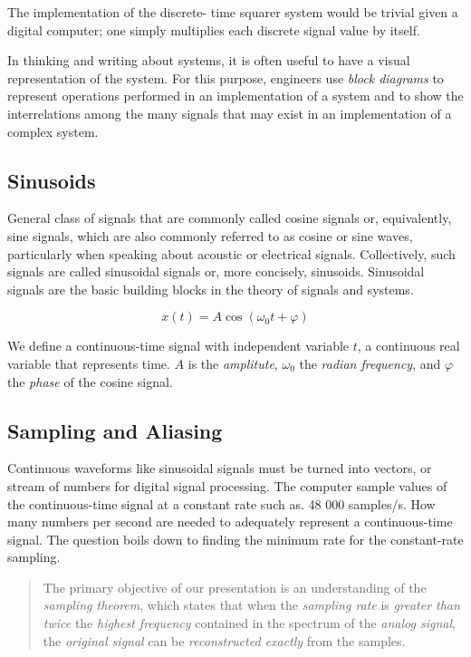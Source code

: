 \documentclass[11pt]{article}
\begin{document}
The implementation of the discrete- time squarer system would be trivial given
a digital computer; one simply multiplies each discrete signal value by itself.

In thinking and writing about systems, it is often useful to have a visual
representation of the system. For this purpose, engineers use
\textit{block diagrams} to represent operations performed in an implementation
of a system and to show the interrelations among the many signals that may exist
in an implementation of a complex system.

\subsection{Sinusoids}

General class of signals that are commonly called cosine signals or,
equivalently, sine signals, which are also commonly referred to as cosine or
sine waves, particularly when speaking about acoustic or electrical signals.
Collectively, such signals are called sinusoidal signals or, more concisely,
sinusoids. Sinusoidal signals are the basic building blocks in the theory of
signals and systems.

\begin{equation}
  x(t) = A \cos (\omega_0 t + \varphi)
\end{equation}

We define a continuous-time signal with independent variable $t$, a continuous
real variable that represents time. $A$ is the \emph{amplitute}, $\omega_0$ the
\textit{radian frequency}, and $\varphi$ the \emph{phase} of the cosine signal.

\subsection{Sampling and Aliasing}

Continuous waveforms like sinusoidal signals must be turned into vectors, or
stream of numbers for digital signal processing. The computer sample values of
the continuous-time signal at a constant rate such as. 48 000 samples/s. How
many numbers per second are needed to adequately represent a continuous-time
signal. The question boils down to finding the minimum rate for the
constant-rate sampling.

\begin{quote}
The primary objective of our presentation is an understanding of the
\emph{sampling theorem}, which states that when the \emph{sampling rate} is
\emph{greater than twice} the \emph{highest frequency} contained in the spectrum
of the \emph{analog signal}, the \emph{original signal} can be
\emph{reconstructed exactly} from the samples.
\end{quote}
\end{document}
